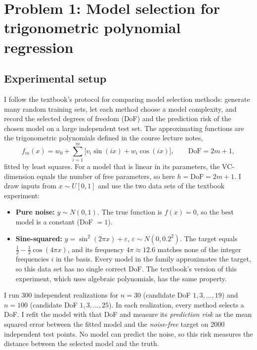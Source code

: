 
\section*{Problem 1: Model selection for trigonometric polynomial regression}

\subsection*{Experimental setup}
I follow the textbook's protocol for comparing model selection methods: generate many random training sets, let
each method choose a model complexity, and record the selected degrees of freedom (DoF) and the prediction risk of
the chosen model on a large independent test set. The approximating functions are the trigonometric polynomials
defined in the course lecture notes,
\[
  f_m(x) = w_0 + \sum_{i=1}^{m} \bigl[ v_i \sin(ix) + w_i \cos(ix) \bigr], \qquad \text{DoF} = 2m + 1,
\]
fitted by least squares. For a model that is linear in its parameters, the VC-dimension equals the number of free
parameters, so here $h = \text{DoF} = 2m + 1$. I draw inputs from $x \sim U[0,1]$ and use the two data sets of the
textbook experiment:
\begin{itemize}
  \item \textbf{Pure noise:} $y \sim N(0, 1)$. The true function is $f(x) = 0$, so the best model is a constant
        (DoF $= 1$).
  \item \textbf{Sine-squared:} $y = \sin^2(2\pi x) + \varepsilon$, $\varepsilon \sim N(0, 0.2^2)$. The target
        equals $\tfrac12 - \tfrac12\cos(4\pi x)$, and its frequency $4\pi \approx 12.6$ matches none of the integer
        frequencies $i$ in the basis. Every model in the family approximates the target, so this data set has no
        single correct DoF. The textbook's version of this experiment, which uses algebraic polynomials, has the same
        property.
\end{itemize}
I run 300 independent realizations for $n = 30$ (candidate DoF $1, 3, \ldots, 19$) and $n = 100$ (candidate DoF
$1, 3, \ldots, 25$). In each realization, every method selects a DoF. I refit the model with that DoF and measure its
\emph{prediction risk} as the mean squared error between the fitted model and the \emph{noise-free} target on 2000
independent test points. No model can predict the noise, so this risk measures the distance between the selected
model and the truth.

